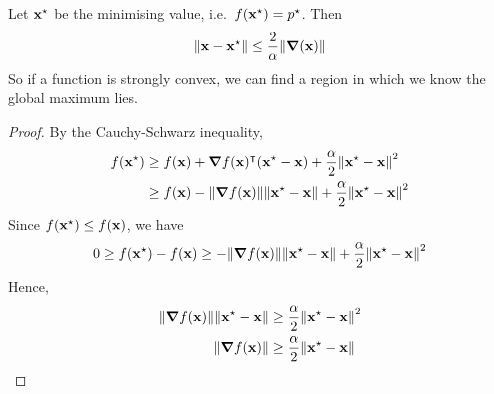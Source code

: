 \begin{claim}
	Let \(\vb x^\star\) be the minimising value, i.e.\ \(f(\vb x^\star) = p^\star\).
	Then
	\[
		\norm{\vb x - \vb x^\star} \leq \frac{2}{\alpha} \norm{\grad(\vb x)}
	\]
	So if a function is strongly convex, we can find a region in which we know the global maximum lies.
\end{claim}
\begin{proof}
	By the Cauchy-Schwarz inequality,
	\begin{align*}
		f(\vb x^\star) & \geq f(\vb x) + \grad{f(\vb x)}^\intercal (\vb x^\star - \vb x) + \frac{\alpha}{2}\norm{\vb x^\star - \vb x}^2  \\
		               & \geq f(\vb x) - \norm{\grad{f(\vb x)}} \norm{\vb x^\star - \vb x} + \frac{\alpha}{2}\norm{\vb x^\star - \vb x}^2
	\end{align*}
	Since \(f(\vb x^\star) \leq f(\vb x)\), we have
	\[
		0 \geq f(\vb x^\star) - f(\vb x) \geq - \norm{\grad{f(\vb x)}} \norm{\vb x^\star - \vb x} + \frac{\alpha}{2}\norm{\vb x^\star - \vb x}^2
	\]
	Hence,
	\begin{align*}
		\norm{\grad{f(\vb x)}} \norm{\vb x^\star - \vb x} & \geq \frac{\alpha}{2}\norm{\vb x^\star - \vb x}^2 \\
		\norm{\grad{f(\vb x)}}                            & \geq \frac{\alpha}{2}\norm{\vb x^\star - \vb x}   \\
	\end{align*}
\end{proof}

